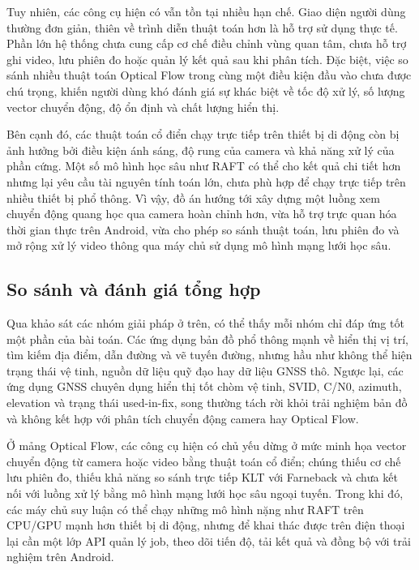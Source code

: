 \documentclass[../DoAn.tex]{subfiles}
\begin{document}
Tuy nhiên, các công cụ hiện có vẫn tồn tại nhiều hạn chế. Giao diện người dùng thường đơn giản, thiên về trình diễn thuật toán hơn là hỗ trợ sử dụng thực tế. Phần lớn hệ thống chưa cung cấp cơ chế điều chỉnh vùng quan tâm, chưa hỗ trợ ghi video, lưu phiên đo hoặc quản lý kết quả sau khi phân tích. Đặc biệt, việc so sánh nhiều thuật toán Optical Flow trong cùng một điều kiện đầu vào chưa được chú trọng, khiến người dùng khó đánh giá sự khác biệt về tốc độ xử lý, số lượng vector chuyển động, độ ổn định và chất lượng hiển thị.

Bên cạnh đó, các thuật toán cổ điển chạy trực tiếp trên thiết bị di động còn bị ảnh hưởng bởi điều kiện ánh sáng, độ rung của camera và khả năng xử lý của phần cứng. Một số mô hình học sâu như RAFT có thể cho kết quả chi tiết hơn nhưng lại yêu cầu tài nguyên tính toán lớn, chưa phù hợp để chạy trực tiếp trên nhiều thiết bị phổ thông. Vì vậy, đồ án hướng tới xây dựng một luồng xem chuyển động quang học qua camera hoàn chỉnh hơn, vừa hỗ trợ trực quan hóa thời gian thực trên Android, vừa cho phép so sánh thuật toán, lưu phiên đo và mở rộng xử lý video thông qua máy chủ sử dụng mô hình mạng lưới học sâu.


\subsection{So sánh và đánh giá tổng hợp}
\label{subsection:2.1.3}
Qua khảo sát các nhóm giải pháp ở trên, có thể thấy mỗi nhóm chỉ đáp ứng tốt một phần của bài toán. Các ứng dụng bản đồ phổ thông mạnh về hiển thị vị trí, tìm kiếm địa điểm, dẫn đường và vẽ tuyến đường, nhưng hầu như không thể hiện trạng thái vệ tinh, nguồn dữ liệu quỹ đạo hay dữ liệu GNSS thô. Ngược lại, các ứng dụng GNSS chuyên dụng hiển thị tốt chòm vệ tinh, SVID, C/N0, azimuth, elevation và trạng thái used-in-fix, song thường tách rời khỏi trải nghiệm bản đồ và không kết hợp với phân tích chuyển động camera hay Optical Flow.

Ở mảng Optical Flow, các công cụ hiện có chủ yếu dừng ở mức minh họa vector chuyển động từ camera hoặc video bằng thuật toán cổ điển; chúng thiếu cơ chế lưu phiên đo, thiếu khả năng so sánh trực tiếp KLT với Farneback và chưa kết nối với luồng xử lý bằng mô hình mạng lưới học sâu ngoại tuyến. Trong khi đó, các máy chủ suy luận có thể chạy những mô hình nặng như RAFT trên CPU/GPU mạnh hơn thiết bị di động, nhưng để khai thác được trên điện thoại lại cần một lớp API quản lý job, theo dõi tiến độ, tải kết quả và đồng bộ với trải nghiệm trên Android.
\end{document}
